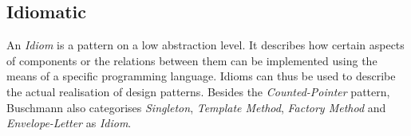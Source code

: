%
%
%
%
%
%
%

\subsection{Idiomatic}
\label{idiomatic_heading}

An \emph{Idiom} is a pattern on a low abstraction level. It describes how certain
aspects of components or the relations between them can be implemented using the
means of a specific programming language. Idioms can thus be used to describe
the actual realisation of design patterns. Besides the \emph{Counted-Pointer}
pattern, Buschmann \cite[p. 377]{buschmann} also categorises \emph{Singleton},
\emph{Template Method}, \emph{Factory Method} and \emph{Envelope-Letter}
\cite{coplien} as \emph{Idiom}.





